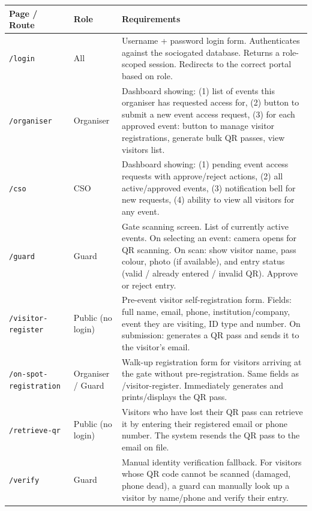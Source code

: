 \documentclass[12pt,a4paper]{article}
\begin{document}
\begin{tabularx}{\textwidth}{L{5cm} L{2.5cm} X}
\toprule
{}
\textbf{Page / Route} & \textbf{Role} & \textbf{Requirements} \\
\midrule
\texttt{/login} & All & Username + password login form. Authenticates against the sociogated database. Returns a role-scoped session. Redirects to the correct portal based on role. \\
\addlinespace
\texttt{/organiser} & Organiser & Dashboard showing: (1) list of events this organiser has requested access for, (2) button to submit a new event access request, (3) for each approved event: button to manage visitor registrations, generate bulk QR passes, view visitors list. \\
\addlinespace
\texttt{/cso} & CSO & Dashboard showing: (1) pending event access requests with approve/reject actions, (2) all active/approved events, (3) notification bell for new requests, (4) ability to view all visitors for any event. \\
\addlinespace
\texttt{/guard} & Guard & Gate scanning screen. List of currently active events. On selecting an event: camera opens for QR scanning. On scan: show visitor name, pass colour, photo (if available), and entry status (valid / already entered / invalid QR). Approve or reject entry. \\
\addlinespace
\texttt{/visitor-register} & Public (no login) & Pre-event visitor self-registration form. Fields: full name, email, phone, institution/company, event they are visiting, ID type and number. On submission: generates a QR pass and sends it to the visitor's email. \\
\addlinespace
\texttt{/on-spot-registration} & Organiser / Guard & Walk-up registration form for visitors arriving at the gate without pre-registration. Same fields as /visitor-register. Immediately generates and prints/displays the QR pass. \\
\addlinespace
\texttt{/retrieve-qr} & Public (no login) & Visitors who have lost their QR pass can retrieve it by entering their registered email or phone number. The system resends the QR pass to the email on file. \\
\addlinespace
\texttt{/verify} & Guard & Manual identity verification fallback. For visitors whose QR code cannot be scanned (damaged, phone dead), a guard can manually look up a visitor by name/phone and verify their entry. \\
\bottomrule
\end{tabularx}
\end{document}
